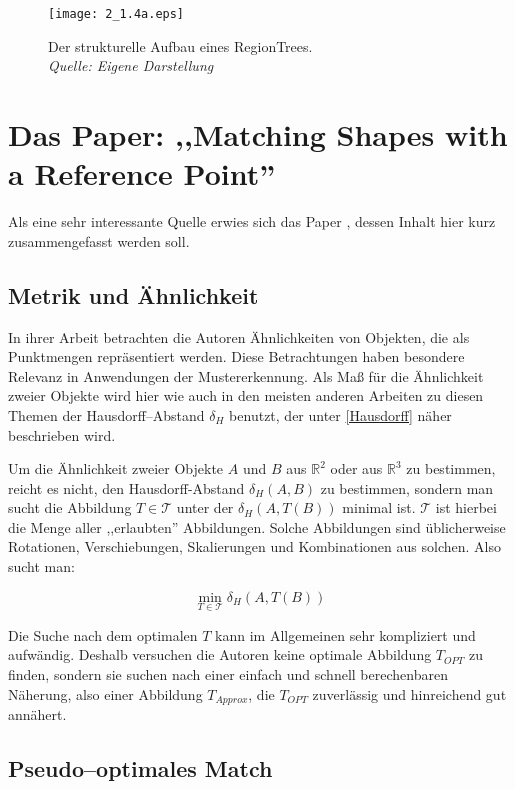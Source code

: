 \begin{figure}
	\centering
	\texttt{[image: 2\_1.4a.eps]}
	\caption[Strukturelle Aufbau eines RegionTrees]{Der strukturelle Aufbau eines RegionTrees.\\\textit{Quelle: Eigene Darstellung}}
	\label{fig:RegionTreeNode}
\end{figure}

\section[Matching Shapes with a Reference Point]{Das Paper: ,,Matching Shapes with a Reference Point'' }\label{AARR}

Als eine sehr interessante Quelle erwies sich das Paper \cite{AAR}, dessen Inhalt hier kurz zusammengefasst werden soll.

\subsection{Metrik und Ähnlichkeit}

In ihrer Arbeit betrachten die Autoren Ähnlichkeiten von Objekten, die als Punktmengen repräsentiert werden. Diese Betrachtungen haben besondere Relevanz in Anwendungen der Mustererkennung. Als Maß für die Ähnlichkeit zweier Objekte wird hier wie auch in den meisten anderen Arbeiten zu diesen Themen der Hausdorff--Abstand $\delta_H$ benutzt, der unter \vref{Hausdorff} näher beschrieben wird.

Um die Ähnlichkeit  zweier Objekte $A$ und $B$ aus $\mathbb{R}^2$ oder aus $\mathbb{R}^3$ zu bestimmen, reicht es nicht, den Hausdorff-Abstand $\delta_H(A,B)$ zu bestimmen, sondern man sucht die Abbildung $T\in\mathcal{T}$ unter der $\delta_H(A,T(B))$ minimal ist. $\mathcal{T}$ ist hierbei die Menge aller ,,erlaubten'' Abbildungen. Solche Abbildungen sind üblicherweise Rotationen, Verschiebungen, Skalierungen und Kombinationen aus solchen. Also sucht man:

$$\min_{T\in\mathcal{T}}\delta_H(A,T(B))$$

Die Suche nach dem optimalen $T$ kann im Allgemeinen sehr kompliziert und aufwändig. Deshalb versuchen die Autoren keine optimale Abbildung $T_{OPT}$ zu finden, sondern sie suchen nach einer einfach und schnell berechenbaren Näherung, also einer Abbildung $T_{Approx}$, die $T_{OPT}$ zuverlässig und hinreichend gut annähert.

\subsection{Pseudo--optimales Match}

